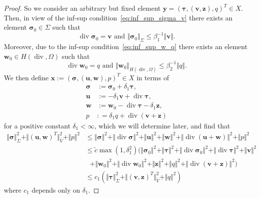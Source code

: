 \documentclass[11pt]{amsart}
\theoremstyle{remark}
\theoremstyle{definition}
\def\sig{{\bm \sigma}}
\def\btau{{\bm \tau}}
\def\bu{{\boldsymbol u}}
\def\bv{{\boldsymbol v}}
\def\bw{{\boldsymbol w}}
\def\tbx{{\bx}}
\def\tsig{\sig}
\def\tbu{{\bu}}
\def\tbw{{\bw}}
\def\tp{{p}}
\renewcommand{\div}{\operatorname{div}}
\renewcommand{\div}{\operatorname{div}}
\def\sig{\boldsymbol \sigma}
\def\bu{\boldsymbol u}
\def\bv{\boldsymbol v}
\def\bw{\boldsymbol w}
\def\bx{\boldsymbol x}
\def\by{\boldsymbol y}
\def\bz{\boldsymbol z}
\begin{document}
\begin{proof}
So we consider an arbitrary but fixed element $\by = (\bm \tau,(\bv,\bz),q)^T \in X$.
Then, in view of the inf-sup condition~\eqref{eq:inf_sup_sigma_v} there exists an element $\sig_0 \in \Sigma$ such that
%
\begin{equation}\label{eq:def_sig_0}
\div \sig_0 = \bv \mbox{ and } \Vert \sig_0 \Vert_\Sigma \le \beta_1^{-1} \Vert \bv \Vert .
\end{equation}
%
Moreover, due to the inf-sup condition~\eqref{eq:inf_sup_w_q} there exists an element $\bw_0 \in H(\div,\Omega)$ such that
%
\begin{equation}\label{eq:def_w_0}
\div \bw_0 = q \mbox{ and } \Vert \bw_0 \Vert_{H(\div,\Omega)} \le \beta_2^{-1} \Vert q \Vert .
\end{equation}
%
We then define $\tbx := (\tsig,(\tbu,\tbw), \tp)^T \in X$ in terms of
%
\begin{subequations}\label{eq:def_x_tilde}
\begin{align}   
\tsig & := \sig_0 + \delta_1 \btau , \label{eq:def_sig_tilde} \\
\tbu & := - \delta_1 \bv + \div \btau , \label{eq:def_u_tilde}  \\
\tbw & := \bw_0 - \div \btau - \delta_1 \bz , \label{eq:def_w_tilde}  \\
\tp & : = \delta_1 q + \div ( \bv + \bz ) \label{eq:def_p_tilde}
\end{align}
\end{subequations}
%
for a positive constant $\delta_1 < \infty$, which we will determine later,
and find that
%
\begin{align*} 
\Vert \tsig \Vert_\Sigma^2 + \Vert (\tbu,\tbw)^T \Vert_{\bar{V}}^2 + \Vert \tp \Vert^2 
& \le \Vert \tsig \Vert^2 + \Vert \div \tsig \Vert^2 + \Vert \tbu \Vert^2 + \Vert \tbw \Vert^2 + \Vert \div (\tbu + \tbw) \Vert^2 + \Vert \tp \Vert^2 \\
& \le \tilde{c} \max (1,\delta_1^2) ( \Vert \sig_0 \Vert^2 +  \Vert \btau \Vert^2  + \Vert \div \sig_0 \Vert^2  + \Vert \div \btau \Vert^2  +  \Vert \bv \Vert^2  \\
& \ \ \ + \Vert \bw_0 \Vert^2 + \Vert \div \bw_0 \Vert^2 + \Vert \bz \Vert^2 + \Vert q \Vert^2 + \Vert \div ( \bv + \bz ) \Vert^2 ) \\
& \le c_1 (\Vert \bm \tau \Vert_\Sigma^2 + \Vert (\bv,\bz)^T \Vert_{\bar{V}}^2 + \Vert q \Vert^2)
\end{align*}
%
where $c_1$ depends only on $\delta_1$.


\end{proof}
\end{document}
